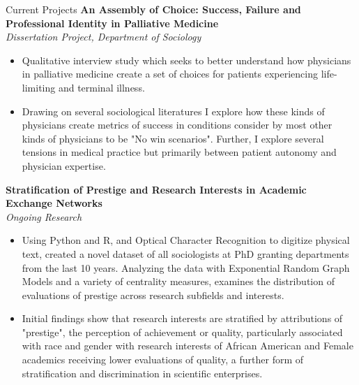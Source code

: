 \documentclass{resume}
\begin{document}
\begin{rSection}{Current Projects}
\noindent \textbf{An Assembly of Choice: Success, Failure and Professional Identity in Palliative Medicine}  \\
\textit{Dissertation Project, Department of Sociology} %
\begin{itemize}[noitemsep,nolistsep,leftmargin=*]
\item {Qualitative interview study which seeks to better understand how physicians in palliative medicine create a set of choices for patients experiencing life-limiting and terminal illness. }
\item { Drawing on several sociological literatures I explore how these kinds of physicians create metrics of success in conditions consider by most other kinds of physicians to be "No win scenarios". Further, I explore several tensions in medical practice but primarily between patient autonomy and physician expertise. \\}

\end{itemize}

\noindent \textbf{Stratification of Prestige and Research Interests in Academic Exchange Networks}  \\
\textit{Ongoing Research} %
\begin{itemize}[noitemsep,nolistsep,leftmargin=*]
\item {Using Python and R, and Optical Character Recognition to digitize physical text, created a novel dataset of all sociologists at PhD granting departments from the last 10 years. Analyzing the data with Exponential Random Graph Models and a variety of centrality measures, examines the distribution of evaluations of prestige across research subfields and interests.}
\item {Initial findings show that research interests are stratified by attributions of "prestige", the perception of achievement or quality, particularly associated with race and gender with research interests of African American and Female academics receiving lower evaluations of quality, a further form of stratification and discrimination in scientific enterprises. \\}
\end{itemize}


\end{rSection}
\end{document}
